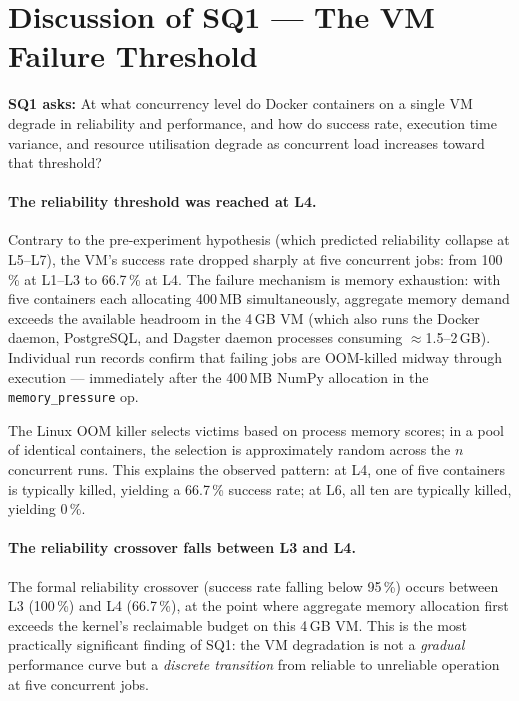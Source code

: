 
\section{Discussion of SQ1 --- The VM Failure Threshold}
\label{sec:discuss-sq1}

\textbf{SQ1 asks:} At what concurrency level do Docker containers on a single VM degrade in reliability and performance, and how do success rate, execution time variance, and resource utilisation degrade as concurrent load increases toward that threshold?

\paragraph{The reliability threshold was reached at L4.}
Contrary to the pre-experiment hypothesis (which predicted reliability collapse at L5--L7), the VM's success rate dropped sharply at five concurrent jobs: from 100\,\% at L1--L3 to 66.7\,\% at L4.
The failure mechanism is memory exhaustion: with five containers each allocating 400\,MB simultaneously, aggregate memory demand exceeds the available headroom in the 4\,GB VM (which also runs the Docker daemon, PostgreSQL, and Dagster daemon processes consuming $\approx$1.5--2\,GB).
Individual run records confirm that failing jobs are OOM-killed midway through execution --- immediately after the 400\,MB NumPy allocation in the \texttt{memory\_pressure} op.

The Linux OOM killer selects victims based on process memory scores; in a pool of identical containers, the selection is approximately random across the $n$ concurrent runs.
This explains the observed pattern: at L4, one of five containers is typically killed, yielding a 66.7\,\% success rate; at L6, all ten are typically killed, yielding 0\,\%.

\paragraph{The reliability crossover falls between L3 and L4.}
The formal reliability crossover (success rate falling below 95\,\%) occurs between L3 (100\,\%) and L4 (66.7\,\%), at the point where aggregate memory allocation first exceeds the kernel's reclaimable budget on this 4\,GB VM.
This is the most practically significant finding of SQ1: the VM degradation is not a \emph{gradual} performance curve but a \emph{discrete transition} from reliable to unreliable operation at five concurrent jobs.

